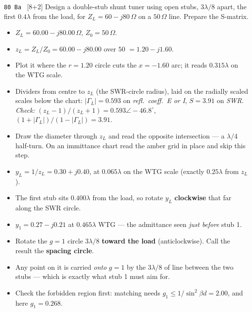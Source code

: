 \begin{asked}{\texttt{80 Ba} \ [8+2]}
Design a double-stub shunt tuner using open stubs, $3\lambda/8$ apart, the first $0.4\lambda$ from the load, for $Z_L = 60-j80\,\Omega$ on a $50\,\Omega$ line. Prepare the S-matrix.
\end{asked}
\begin{itemize}
  \item $Z_L = 60.00 - j80.00\,\Omega$, $Z_0 = 50\,\Omega$.
\end{itemize}
\begin{itemize}
  \item $z_L = Z_L/Z_0 = 60.00 - j80.00$ over $50$ $=1.20 - j1.60$.
  \item Plot it where the $r = 1.20$ circle cuts the $x = -1.60$ arc; it reads $0.315\lambda$ on the WTG scale.
  \item Dividers from centre to $z_L$ (the SWR-circle radius), laid on the radially scaled scales below the chart: $|\Gamma_L| = 0.593$ on \emph{refl.\ coeff.\ E or I}, $S = 3.91$ on \emph{SWR}. \textit{Check:} $(z_L-1)/(z_L+1) = 0.593\angle -46.8^\circ$, $(1+|\Gamma_L|)/(1-|\Gamma_L|) = 3.91$.
\end{itemize}
\begin{itemize}
  \item Draw the diameter through $z_L$ and read the opposite intersection --- a $\lambda/4$ half-turn. On an immittance chart read the amber grid in place and skip this step.
  \item $y_L = 1/z_L = 0.30 + j0.40$, at $0.065\lambda$ on the WTG scale (exactly $0.25\lambda$ from $z_L$).
\end{itemize}
\begin{itemize}
  \item The first stub sits $0.400\lambda$ from the load, so rotate $y_L$ \textbf{clockwise} that far along the SWR circle.
  \item $y_1 = 0.27 - j0.21$ at $0.465\lambda$ WTG --- the admittance seen \emph{just before} stub 1.
\end{itemize}
\begin{itemize}
  \item Rotate the $g=1$ circle $3\lambda/8$ \textbf{toward the load} (anticlockwise). Call the result the \textbf{spacing circle}.
  \item Any point on it is carried \emph{onto} $g=1$ by the $3\lambda/8$ of line between the two stubs --- which is exactly what stub 1 must aim for.
  \item Check the forbidden region first: matching needs $g_1 \le 1/\sin^2\beta d = 2.00$, and here $g_1 = 0.268$. \checkmark
\end{itemize}
